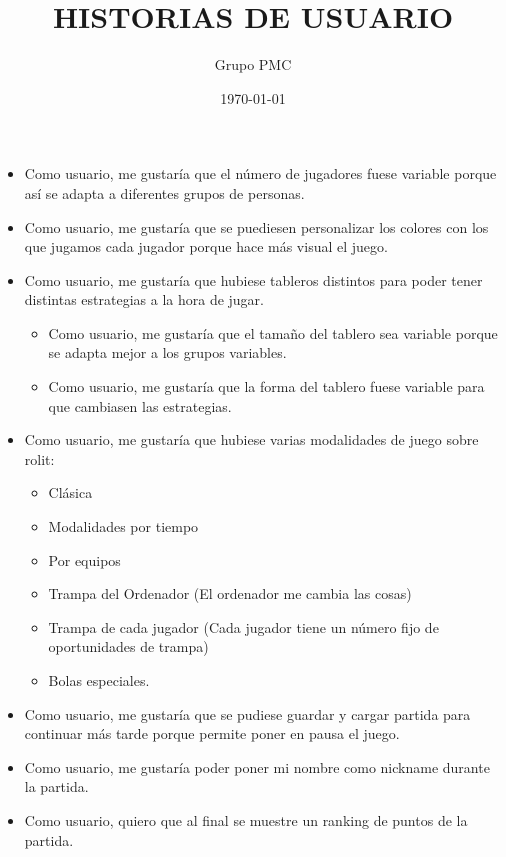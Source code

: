 \documentclass{article}
\title{HISTORIAS DE USUARIO}
\date{\today}
\author{Grupo PMC}
\begin{document}
\maketitle

\begin{itemize}
\item Como usuario, me gustaría que el número de jugadores fuese variable porque así se adapta a diferentes grupos de personas.

\item Como usuario, me gustaría que se puediesen personalizar los colores con los que jugamos cada jugador porque hace más visual el juego.

\item Como usuario, me gustaría que hubiese tableros distintos para poder tener distintas estrategias a la hora de jugar.
\begin{itemize}
	\item Como usuario, me gustaría que el tamaño del tablero sea variable porque se adapta mejor a los grupos variables.
	\item Como usuario, me gustaría que la forma del tablero fuese variable para que cambiasen las estrategias.
\end{itemize}

\item Como usuario, me gustaría que hubiese varias modalidades de juego sobre rolit:
\begin{itemize}
\item Clásica
\item Modalidades por tiempo
\item Por equipos
\item Trampa del Ordenador (El ordenador me cambia las cosas)
\item Trampa de cada jugador (Cada jugador tiene un número fijo de oportunidades de trampa)
\item Bolas especiales.
\end{itemize}

\item Como usuario, me gustaría que se pudiese guardar y cargar partida para continuar más tarde porque permite poner en pausa el juego.

\item Como usuario, me gustaría poder poner mi nombre como nickname durante la partida.

\item Como usuario, quiero que al final se muestre un ranking de puntos de la partida.


\end{itemize}
\end{document}
